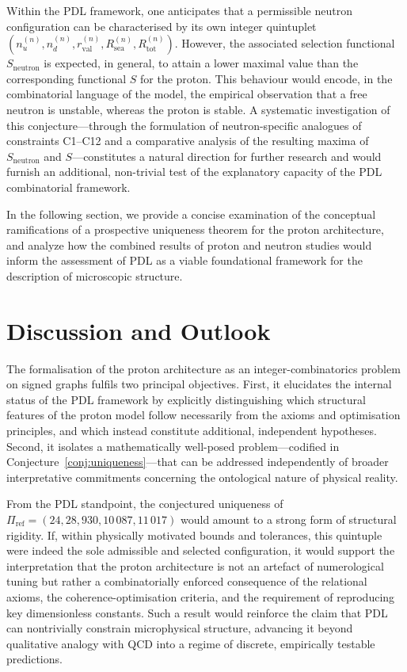 \documentclass[11pt,a4paper]{article}
\begin{document}
Within the PDL framework, one anticipates that a permissible neutron configuration can be characterised by its own integer quintuplet $(n_u^{(n)},n_d^{(n)},r_{\mathrm{val}}^{(n)},R_{\mathrm{sea}}^{(n)},R_{\mathrm{tot}}^{(n)})$. However, the associated selection functional $S_{\mathrm{neutron}}$ is expected, in general, to attain a lower maximal value than the corresponding functional $S$ for the proton. This behaviour would encode, in the combinatorial language of the model, the empirical observation that a free neutron is unstable, whereas the proton is stable. A systematic investigation of this conjecture—through the formulation of neutron-specific analogues of constraints C1–C12 and a comparative analysis of the resulting maxima of $S_{\mathrm{neutron}}$ and $S$—constitutes a natural direction for further research and would furnish an additional, non-trivial test of the explanatory capacity of the PDL combinatorial framework.

In the following section, we provide a concise examination of the conceptual ramifications of a prospective uniqueness theorem for the proton architecture, and analyze how the combined results of proton and neutron studies would inform the assessment of PDL as a viable foundational framework for the description of microscopic structure.

\section{Discussion and Outlook}
\label{sec:discussion}

The formalisation of the proton architecture as an integer-combinatorics problem on signed graphs fulfils two principal objectives. First, it elucidates the internal status of the PDL framework by explicitly distinguishing which structural features of the proton model follow necessarily from the axioms and optimisation principles, and which instead constitute additional, independent hypotheses. Second, it isolates a mathematically well-posed problem—codified in Conjecture~\ref{conj:uniqueness}—that can be addressed independently of broader interpretative commitments concerning the ontological nature of physical reality.

From the PDL standpoint, the conjectured uniqueness of $\Pi_{\mathrm{ref}}=(24,28,930,10\,087,11\,017)$ would amount to a strong form of structural rigidity. If, within physically motivated bounds and tolerances, this quintuple were indeed the sole admissible and selected configuration, it would support the interpretation that the proton architecture is not an artefact of numerological tuning but rather a combinatorially enforced consequence of the relational axioms, the coherence-optimisation criteria, and the requirement of reproducing key dimensionless constants.\cite{LaubscherPDLFull2026,LaubscherLDP2026,LaubscherDerivationAlpha2026} Such a result would reinforce the claim that PDL can nontrivially constrain microphysical structure, advancing it beyond qualitative analogy with QCD into a regime of discrete, empirically testable predictions.
\end{document}
